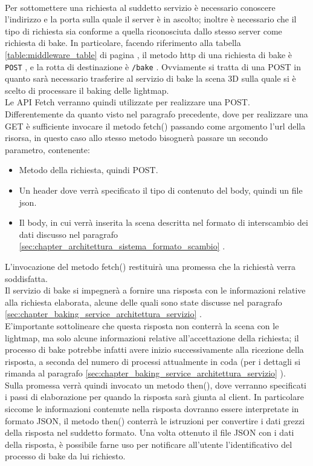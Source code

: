 \\
Per sottomettere una richiesta al suddetto servizio è necessario conoscere l’indirizzo e la porta sulla quale il server è in ascolto; inoltre è necessario che il tipo di richiesta sia conforme a quella riconosciuta dallo stesso server come richiesta di bake. In particolare, facendo riferimento alla tabella \ref{table:middleware_table} di pagina \pageref{table:middleware_table} , il metodo http di una richiesta di bake è \texttt{POST} , e la rotta di destinazione è \texttt{/bake} . Ovviamente si tratta di una POST in quanto sarà necessario trasferire al servizio di bake la scena 3D sulla quale si è scelto di processare il baking delle lightmap.
\\
Le API Fetch verranno quindi utilizzate per realizzare una POST. Differentemente da quanto visto nel paragrafo precedente, dove per realizzare una GET è sufficiente invocare il metodo fetch() passando come argomento l’url della risorsa, in questo caso allo stesso metodo bisognerà passare un secondo parametro, contenente:
\begin{itemize}
\item Metodo della richiesta, quindi POST.
\item Un header dove verrà specificato il tipo di contenuto del body, quindi un file json.
\item Il body, in cui verrà inserita la scena descritta nel formato di interscambio dei dati discusso nel paragrafo \ref{sec:chapter_architettura_sistema_formato_scambio} .
\end{itemize}
L’invocazione del metodo fetch() restituirà una promessa che la richiestà verra soddisfatta.
\\ 
Il servizio di bake si impegnerà a fornire una risposta con le informazioni relative alla richiesta elaborata, alcune delle quali sono state discusse nel paragrafo \ref{sec:chapter_baking_service_architettura_servizio} .
\\
E’importante sottolineare che questa risposta non conterrà la scena con le lightmap, ma solo alcune informazioni relative all’accettazione della richiesta; il processo di bake potrebbe infatti avere inizio successivamente alla ricezione della risposta, a seconda del numero di processi attualmente in coda (per i dettagli si rimanda al paragrafo \ref{sec:chapter_baking_service_architettura_servizio} ).
\\ 
Sulla promessa verrà quindi invocato un metodo then(), dove verranno specificati i passi di elaborazione per quando la risposta sarà giunta al client. In particolare siccome le informazioni contenute nella risposta dovranno essere interpretate in formato JSON, il metodo then() conterrà le istruzioni per convertire i dati grezzi della risposta nel suddetto formato. Una volta ottenuto il file JSON con i dati della risposta, è possibile farne uso per notificare all’utente l’identificativo del processo di bake da lui richiesto.
